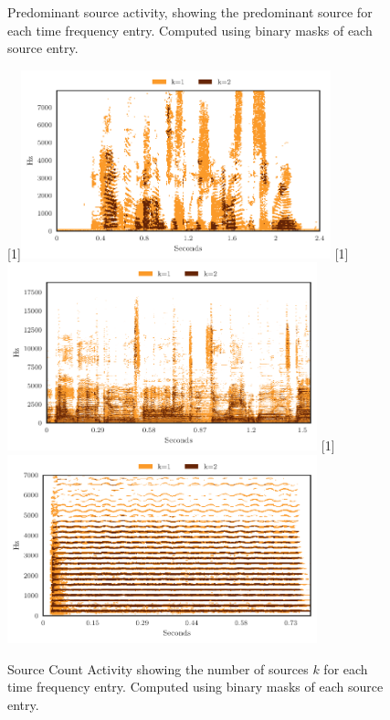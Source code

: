 \begin{figure}[hb]
\caption{Predominant source activity, showing the predominant source for each time  frequency entry. Computed using binary masks of each source entry.}
\label{fig:dominance}
\end{figure}

\begin{figure}[hb]
\centering
{}%
[1\textwidth]{\includegraphics[width=0.8\textwidth]{Chapters/02_Fundamentals/figures/count_map_speakers.pdf}}%
\hspace{0.2\textwidth} %
[1\textwidth]{\includegraphics[width=0.8\textwidth]{Chapters/02_Fundamentals/figures/count_map_vocacc.pdf}}%
\hspace{0.2\textwidth} %
[1\textwidth]{\includegraphics[width=0.8\textwidth]{Chapters/02_Fundamentals/figures/count_map_unison.pdf}}%
\caption{Source Count Activity showing the number of sources $k$ for each time frequency entry. Computed using binary masks of each source entry.}
\label{fig:count}
\end{figure}

